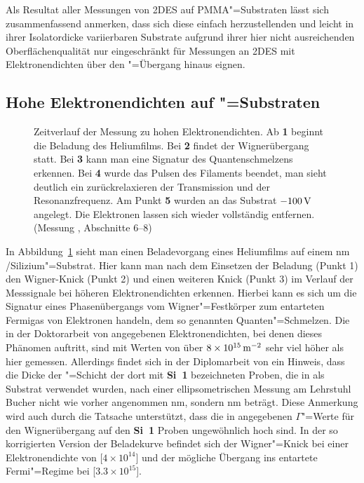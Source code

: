 Als Resultat aller Messungen von 2DES auf PMMA"=Substraten lässt sich zusammenfassend anmerken, dass sich diese einfach herzustellenden und leicht in ihrer Isolatordicke variierbaren Substrate aufgrund ihrer hier nicht ausreichenden Oberflächenqualität nur eingeschränkt für Messungen an 2DES mit Elektronendichten über den "=Übergang hinaus eignen.

\subsection{Hohe Elektronendichten auf \SiO"=Substraten}
\enlargethispage{1\baselineskip}

\begin{figure}[h!tb]
    \hfill%
    \begin{minipage}[b]{\textwidth-\midwidth-\tabcolsep}
        \caption[Hohe Elektronendichten auf \SiO, Zeitverlauf]{Zeitverlauf der Messung zu hohen Elektronendichten. Ab {\bfseries 1} beginnt die Beladung des Heliumfilms. Bei {\bfseries 2} findet der Wignerübergang statt. Bei {\bfseries 3} kann man eine Signatur des Quantenschmelzens erkennen. Bei {\bfseries 4} wurde das Pulsen des Filaments beendet, man sieht deutlich ein zurückrelaxieren der Transmission und der Resonanzfrequenz. Am Punkt {\bfseries 5} wurden an das Substrat $\unit[-100]{V}$ angelegt. Die Elektronen lassen sich wieder vollständig entfernen. (Messung , Abschnitte 6--8)}
        \label{fig:quantum_time}
    \end{minipage}
\end{figure}

In Abbildung~\ref{fig:quantum_time} sieht man einen Beladevorgang eines Heliumfilms auf einem \unit[200]{nm} \SiO/Sili\-zi\-um"=Substrat. Hier kann man nach dem Einsetzen der Beladung (Punkt 1) den Wigner-Knick (Punkt 2) und einen weiteren Knick (Punkt 3) im Verlauf der Messsignale bei höheren Elektronendichten erkennen. Hierbei kann es sich um die Signatur eines Phasenübergangs vom Wigner"=Festkörper zum entarteten Fermigas von Elektronen handeln, dem so genannten Quanten"=Schmelzen. Die in der Doktorarbeit von  \cite{guenzler} angegebenen Elektronendichten, bei denen dieses Phänomen auftritt, sind mit Werten von über $\unit[8\times10^{15}]{\Em}$ sehr viel höher als hier gemessen. Allerdings findet sich in der Diplomarbeit von  \cite{bitnar} ein Hinweis, dass die Dicke der \SiO"=Schicht der dort mit {\bfseries Si~1}  bezeichneten Proben, die in \cite{guenzler,bitnar,Gue96} als Substrat verwendet wurden, nach einer ellipsometrischen Messung am Lehrstuhl Bucher nicht wie vorher angenommen \unit[100]{nm}, sondern \unit[262]{nm} beträgt. Diese Anmerkung wird auch durch die Tatsache unterstützt, dass die in \cite{guenzler} angegebenen $\Gamma$"=Werte für den Wignerübergang auf den {\bfseries Si~1} Proben ungewöhnlich hoch sind. In der so korrigierten Version der Beladekurve befindet sich der Wigner"=Knick bei einer Elektronendichte von \unit[$4\times10^{14}$]{\Em} und der mögliche Übergang ins entartete Fermi"=Regime bei \unit[$3.3\times10^{15}$]{\Em}.

